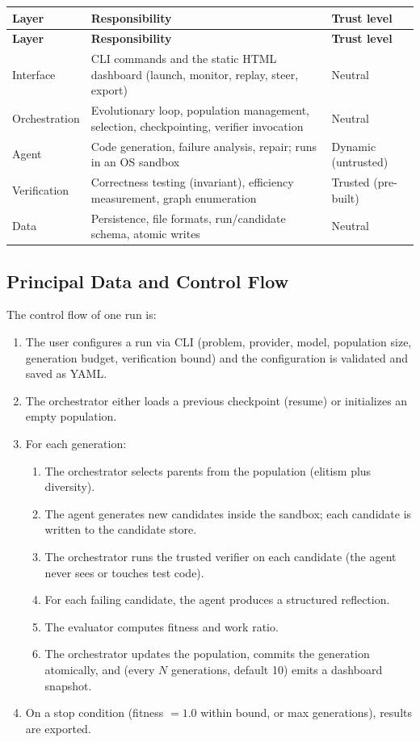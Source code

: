 \documentclass[12pt,a4paper]{article}
\begin{document}
\begin{longtable}{|p{3cm}|p{6cm}|p{4.5cm}|}
\hline
\textbf{Layer} & \textbf{Responsibility} & \textbf{Trust level} \\
\hline
\endfirsthead
\hline
\textbf{Layer} & \textbf{Responsibility} & \textbf{Trust level} \\
\hline
\endhead
\hline
\endfoot

Interface & CLI commands and the static HTML dashboard (launch, monitor, replay, steer, export) & Neutral \\
\hline
Orchestration & Evolutionary loop, population management, selection, checkpointing, verifier invocation & Neutral \\
\hline
Agent & Code generation, failure analysis, repair; runs in an OS sandbox & Dynamic (untrusted) \\
\hline
Verification & Correctness testing (invariant), efficiency measurement, graph enumeration & Trusted (pre-built) \\
\hline
Data & Persistence, file formats, run/candidate schema, atomic writes & Neutral \\
\hline
\end{longtable}

\subsection{Principal Data and Control Flow}

The control flow of one run is:

\begin{enumerate}[noitemsep]
  \item The user configures a run via CLI (problem, provider, model, population size, generation budget, verification bound) and the configuration is validated and saved as YAML.
  \item The orchestrator either loads a previous checkpoint (resume) or initializes an empty population.
  \item For each generation:
  \begin{enumerate}[label=\alph*)]
    \item The orchestrator selects parents from the population (elitism plus diversity).
    \item The agent generates new candidates inside the sandbox; each candidate is written to the candidate store.
    \item The orchestrator runs the trusted verifier on each candidate (the agent never sees or touches test code).
    \item For each failing candidate, the agent produces a structured reflection.
    \item The evaluator computes fitness and work ratio.
    \item The orchestrator updates the population, commits the generation atomically, and (every $N$ generations, default 10) emits a dashboard snapshot.
  \end{enumerate}
  \item On a stop condition (fitness $= 1.0$ within bound, or max generations), results are exported.
\end{enumerate}
\end{document}
